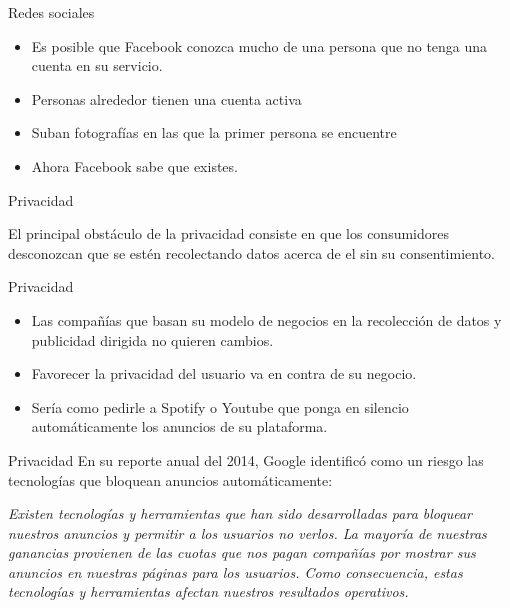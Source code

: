 \documentclass[11pt,aspectratio=169]{beamer}
\begin{document}
\begin{frame}{Redes sociales}
    \begin{itemize}
        \item Es posible que Facebook conozca mucho de una persona que no tenga una cuenta en su servicio.\pause
        \item Personas alrededor tienen una cuenta activa\pause
        \item Suban fotografías en las que la primer persona se encuentre\pause
        \item Ahora Facebook sabe que existes. 
    \end{itemize}
    \end{frame}
    
    \begin{frame}{Privacidad}
    \begin{block}{}
        \begin{center}
            El principal obstáculo de la privacidad consiste en que los consumidores desconozcan que se estén recolectando datos acerca de el sin su consentimiento.
        \end{center}	
    \end{block}
    \end{frame}
    
    \begin{frame}{Privacidad}
    \begin{itemize}
        \item Las compañías que basan su modelo de negocios en la recolección de datos y publicidad dirigida no quieren cambios.\pause
        \item Favorecer la privacidad del usuario va en contra de su negocio.\pause
        \item Sería como pedirle a Spotify o Youtube que ponga en silencio automáticamente los anuncios de su plataforma.
    \end{itemize}
    \end{frame}
    
    \begin{frame}{Privacidad}
    En su reporte anual del 2014, Google identificó como un riesgo las tecnologías que bloquean anuncios automáticamente:\pause
    \begin{block}{}
    \textit{Existen tecnologías y herramientas que han sido desarrolladas para bloquear nuestros anuncios y permitir a los usuarios no verlos. La mayoría 
    de nuestras ganancias provienen de las cuotas que nos pagan compañías por mostrar sus anuncios en nuestras páginas para los usuarios. Como consecuencia, 
    estas tecnologías y herramientas afectan nuestros resultados operativos.}
    \end{block}
    \end{frame}
    
\end{document}
